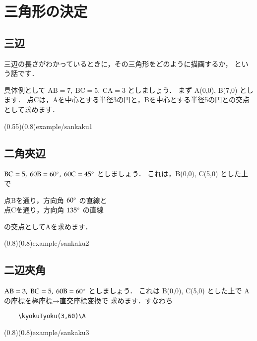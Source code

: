 \section{三角形の決定}
\subsection{三辺}
三辺の長さがわかっているときに，その三角形をどのように描画するか，
という話です．

具体例として $\mathrm{AB=7,~BC=5,~CA=3}$ としましょう．
まず A(0,0), B(7,0) とします．
点Cは，Aを中心とする半径3の円と，Bを中心とする半径5の円との交点
として求めます．

\showexample[三角形の決定(1)三辺](0.55)(0.8){example/sankaku1}

\subsection{二角夾辺}
$\mathrm{BC=5,~60{B}=60^{\circ},~60{C}=45^{\circ}}$
としましょう．
これは，B(0,0), C(5,0) とした上で
\begin{jquote}
    点Bを通り，方向角 $60^{\circ}$ の直線と\\
    点Cを通り，方向角 $135^{\circ}$ の直線
\end{jquote}
の交点としてAを求めます．

(0.8)(0.8){example/sankaku2}

\subsection{二辺夾角}
$\mathrm{AB=3,~BC=5,~60{B}=60^{\circ}}$
としましょう．
これは B(0,0), C(5,0) とした上で A の座標を極座標→直交座標変換で
求めます．すなわち
\begin{jquote}
\begin{verbatim}
    \kyokuTyoku(3,60)\A
\end{verbatim}
\end{jquote}

(0.8)(0.8){example/sankaku3}
